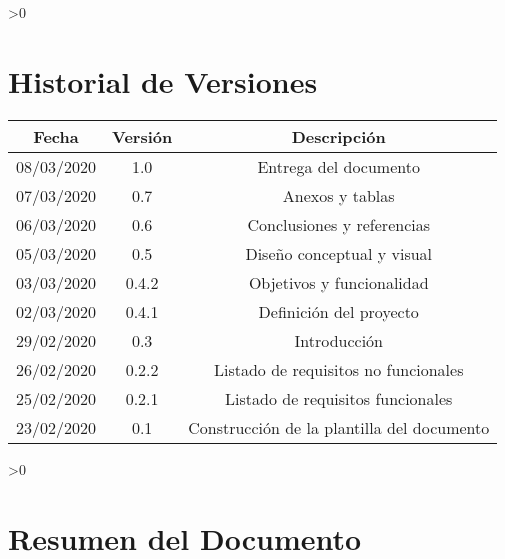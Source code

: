 \documentclass[12pt]{book} %
\newcounter{resumen}
\newcounter{tablas}
\begin{document}
\setlength{\cftbeforelottitleskip}{0.5cm}
\renewcommand{\cftlottitlefont}{\Huge\color{green_uam}}

\setlength{\cftbeforeloftitleskip}{0.5cm}
\renewcommand{\cftloftitlefont}{\Huge\color{green_uam}}

\makeatletter
\patchcmd{\chapter}{\if@openright\cleardoublepage\else\clearpage\fi}{}{}{}
\makeatother

\ifnum \value{resumen}>0
{
    
    
    \chapter*{Historial de Versiones}
    
    \begin{center}
        \begin{tabular}{c|c|c}
            \bfseries Fecha & \bfseries Versión & \bfseries Descripción \\
            \hline
            08/03/2020 & 1.0 & Entrega del documento\\
            \hline
            07/03/2020 & 0.7 & Anexos y tablas\\
            \hline
            06/03/2020 & 0.6 & Conclusiones y referencias\\
            \hline
            05/03/2020 & 0.5 & Diseño conceptual y visual\\
            \hline
            03/03/2020 & 0.4.2 & Objetivos y funcionalidad\\
            \hline
            02/03/2020 & 0.4.1 & Definición del proyecto\\
            \hline
            29/02/2020 & 0.3 & Introducción\\
            \hline
            26/02/2020 & 0.2.2 & Listado de requisitos no funcionales\\
            \hline
            25/02/2020 & 0.2.1 & Listado de requisitos funcionales\\
            \hline
            23/02/2020 & 0.1 & Construcción de la plantilla del documento\\
            \hline
        \end{tabular}
    \end{center}
    
\newpage
}
\fi

\ifnum \value{resumen}>0
{
\chapter*{Resumen del Documento}



\newpage
}
\fi
\end{document}

